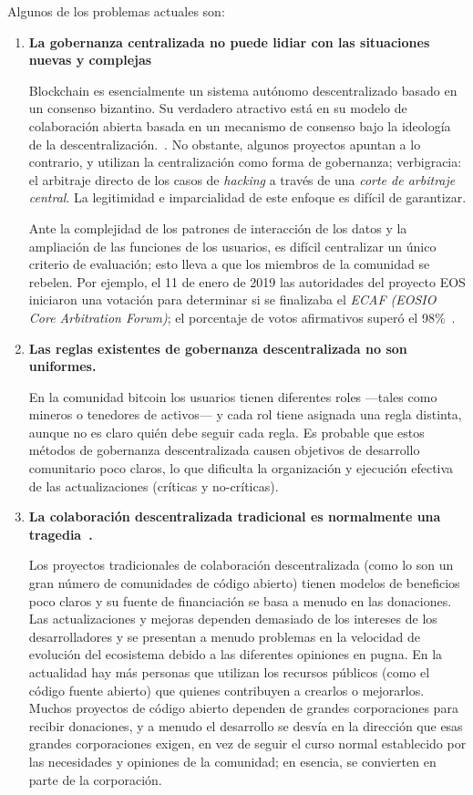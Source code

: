 Algunos de los problemas actuales son:

\begin{enumerate}
	\item

	\textbf{La gobernanza centralizada no puede lidiar con las situaciones nuevas y complejas}

	Blockchain es esencialmente un sistema autónomo descentralizado basado en un consenso bizantino. Su verdadero atractivo está en su modelo de colaboración abierta basada en un mecanismo de consenso bajo la ideología de la descentralización.~\cite{whitepaper}. No obstante, algunos proyectos \blockchain apuntan a lo contrario, y utilizan la centralización como forma de gobernanza; verbigracia: el arbitraje directo de los casos de \textit{hacking} a través de una \textit{corte de arbitraje central}. La legitimidad e imparcialidad de este enfoque es difícil de garantizar.

	Ante la complejidad de los patrones de interacción de los datos y la ampliación de las funciones de los usuarios, es difícil centralizar un único criterio de evaluación; esto lleva a que los miembros de la comunidad se rebelen. Por ejemplo, el 11 de enero de 2019 las autoridades del proyecto EOS iniciaron una votación para determinar si se finalizaba el \textit{ECAF (EOSIO Core Arbitration Forum)}; el porcentaje de votos afirmativos superó el 98\%~\cite{DeleteECAF}.

	\item

	\textbf{Las reglas existentes de gobernanza descentralizada no son uniformes.}

	En la comunidad bitcoin los usuarios tienen diferentes roles —tales como mineros o tenedores de activos— y cada rol tiene asignada una regla distinta, aunque no es claro quién debe seguir cada regla. Es probable que estos métodos de gobernanza descentralizada causen objetivos de desarrollo comunitario poco claros, lo que dificulta la organización y ejecución efectiva de las actualizaciones (críticas y no-críticas).

	\item

	\textbf{La colaboración descentralizada tradicional es normalmente una tragedia~\cite{TragedyOfTheCommons}.}

	Los proyectos tradicionales de colaboración descentralizada (como lo son un gran número de comunidades de código abierto) tienen modelos de beneficios poco claros y su fuente de financiación se basa a menudo en las donaciones. Las actualizaciones y mejoras dependen demasiado de los intereses de los desarrolladores y se presentan a menudo problemas en la velocidad de evolución del ecosistema debido a las diferentes opiniones en pugna. En la actualidad hay más personas que utilizan los recursos públicos (como el código fuente abierto) que quienes contribuyen a crearlos o mejorarlos. Muchos proyectos de código abierto dependen de grandes corporaciones para recibir donaciones, y a menudo el desarrollo se desvía en la dirección que esas grandes corporaciones exigen, en vez de seguir el curso normal establecido por las necesidades y opiniones de la comunidad; en esencia, se convierten en parte de la corporación.


\end{enumerate}
